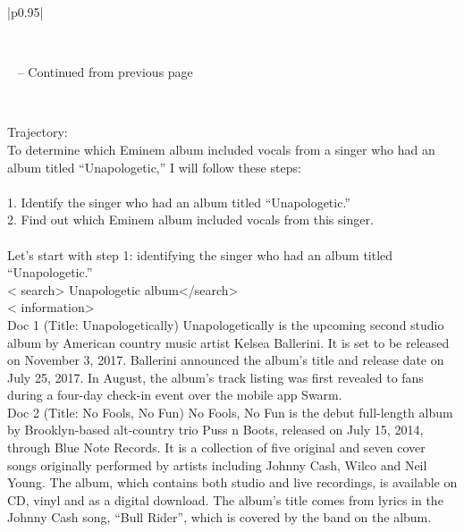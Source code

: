 \documentclass[11pt]{article}
\begin{document}
\begin{longtable}{|p{}|}
\caption{Search-R1 hallucinates Kelly Clarkson as the singer, even though she is not mentioned in the retrieved documents, instead of identifying Rihanna, and incorrectly predicts ``Encore.''}\label{tab:search-r1} \\
\hline
\endfirsthead

%
{{\tablename\ \thetable{} -- Continued from previous page}} \\
\hline
\endhead

\hline {} \\
\endfoot

\hline
\endlastfoot

Trajectory: \\
To determine which Eminem album included vocals from a singer who had an album titled ``Unapologetic,'' I will follow these steps: \\
\\
1. Identify the singer who had an album titled ``Unapologetic.'' \\
2. Find out which Eminem album included vocals from this singer. \\
\\
Let's start with step 1: identifying the singer who had an album titled ``Unapologetic.'' \\
\hline
\textless{} search\textgreater{} Unapologetic album\textless{}/search\textgreater{} \\
\hline
\textless{} information\textgreater{} \\
Doc 1 (Title: Unapologetically) Unapologetically is the upcoming second studio album by American country music artist Kelsea Ballerini. It is set to be released on November 3, 2017. Ballerini announced the album's title and release date on July 25, 2017. In August, the album's track listing was first revealed to fans during a four-day check-in event over the mobile app Swarm. \\
Doc 2 (Title: No Fools, No Fun) No Fools, No Fun is the debut full-length album by Brooklyn-based alt-country trio Puss n Boots, released on July 15, 2014, through Blue Note Records. It is a collection of five original and seven cover songs originally performed by artists including Johnny Cash, Wilco and Neil Young. The album, which contains both studio and live recordings, is available on CD, vinyl and as a digital download. The album's title comes from lyrics in the Johnny Cash song, ``Bull Rider'', which is covered by the band on the album. \\

\end{longtable}
\end{document}
